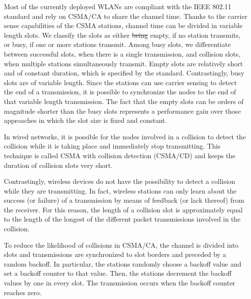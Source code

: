 \documentclass[journal]{IEEEtran}
\providecommand{\DIFdel}[1]{{\protect\color{red}\sout{#1}}}                      %
\providecommand{\DIFdelbegin}{} %
\providecommand{\DIFdelend}{} %
\begin{document}
Most of the currently deployed WLANs are compliant with the IEEE 802.11 standard and rely on CSMA/CA to share the channel time.
Thanks to the carrier sense capabilities of the CSMA stations, channel time can be divided in variable length slots.
We classify the slots as either \DIFdelbegin \DIFdel{being }\DIFdelend empty, if no station transmits, or busy, if one or more stations transmit.
Among busy slots, we differentiate between successful slots, when there is a single transmission, and collision slots, when multiple stations simultaneously transmit.
Empty slots are relatively short and of constant duration, which is specified by the standard.
Contrastingly, busy slots are of variable length. 
Since the stations can use carrier sensing to detect the end of a transmission, it is possible to synchronize the nodes to the end of that variable length transmission.
The fact that the empty slots can be orders of magnitude shorter than the busy slots represents a performance gain over those approaches in which the slot size is fixed and constant.

In wired networks, it is possible for the nodes involved in a collision to detect the collision while it is taking place and immediately stop transmitting.
This technique is called CSMA with collision detection (CSMA/CD) and keeps the duration of collision slots very short.

Contrastingly, wireless devices do not have the possibility to detect a collision while they are transmitting.
In fact, wireless stations can only learn about the success (or failure) of a transmission by means of feedback (or lack thereof) from the receiver.
For this reason, the length of a collision slot is approximately equal to the length of the longest of the different packet transmissions involved in the collision.

To reduce the likelihood of collisions in CSMA/CA, the channel is divided into slots and transmissions are synchronized to slot borders and preceded by a random backoff.
In particular, the stations randomly choose a backoff value and set a backoff counter to that value.
Then, the stations decrement the backoff values by one in every slot.
The transmission occurs when the backoff counter reaches zero.
\end{document}
